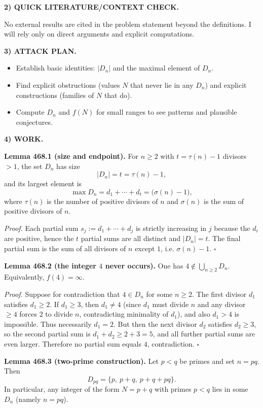 \medskip
\noindent\textbf{2) QUICK LITERATURE/CONTEXT CHECK.}

No external results are cited in the problem statement beyond the definitions. I will rely only on direct arguments and explicit computations.

\medskip
\noindent\textbf{3) ATTACK PLAN.}

\begin{itemize}
\item Establish basic identities: $|D_n|$ and the maximal element of $D_n$.
\item Find explicit obstructions (values $N$ that never lie in any $D_n$) and explicit constructions (families of $N$ that do).
\item Compute $D_n$ and $f(N)$ for small ranges to see patterns and plausible conjectures.
\end{itemize}

\medskip
\noindent\textbf{4) WORK.}

\noindent\textbf{Lemma 468.1 (size and endpoint).}
For $n\ge 2$ with $t=\tau(n)-1$ divisors $>1$, the set $D_n$ has size
\[
|D_n|=t=\tau(n)-1,
\]
and its largest element is
\[
\max D_n = d_1+\cdots+d_t = \bigl(\sigma(n)-1\bigr),
\]
where $\tau(n)$ is the number of positive divisors of $n$ and $\sigma(n)$ is the sum of positive divisors of $n$.

\textit{Proof.}
Each partial sum $s_j:=d_1+\cdots+d_j$ is strictly increasing in $j$ because the $d_i$ are positive, hence the $t$ partial sums are all distinct and $|D_n|=t$. The final partial sum is the sum of all divisors of $n$ except $1$, i.e. $\sigma(n)-1$. \hfill$\square$

\medskip
\noindent\textbf{Lemma 468.2 (the integer $4$ never occurs).}
One has $4\notin \bigcup_{n\ge 2} D_n$. Equivalently, $f(4)=\infty$.

\textit{Proof.}
Suppose for contradiction that $4\in D_n$ for some $n\ge 2$. The first divisor $d_1$ satisfies $d_1\ge 2$. If $d_1\ge 3$, then $d_1\ne 4$ (since $d_1$ must divide $n$ and any divisor $\ge 4$ forces $2$ to divide $n$, contradicting minimality of $d_1$), and also $d_1>4$ is impossible. Thus necessarily $d_1=2$. But then the next divisor $d_2$ satisfies $d_2\ge 3$, so the second partial sum is $d_1+d_2\ge 2+3=5$, and all further partial sums are even larger. Therefore no partial sum equals $4$, contradiction. \hfill$\square$

\medskip
\noindent\textbf{Lemma 468.3 (two-prime construction).}
Let $p<q$ be primes and set $n=pq$. Then
\[
D_{pq}=\{p,\ p+q,\ p+q+pq\}.
\]
In particular, any integer of the form $N=p+q$ with primes $p<q$ lies in some $D_n$ (namely $n=pq$).

